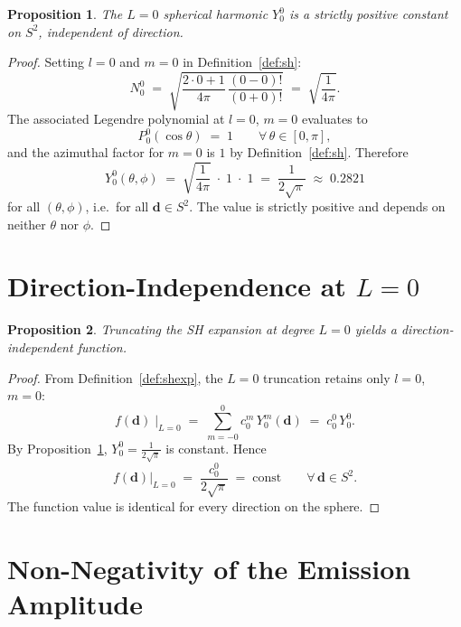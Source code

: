 \documentclass[12pt, a4paper]{article}
\theoremstyle{definition}
\theoremstyle{plain}
\newtheorem{proposition}{Proposition}[section]
\theoremstyle{remark}
\newcommand{\Stwo}{S^2}
\begin{document}
\begin{proposition}
\label{prop:Y00constant}
The $L=0$ spherical harmonic $Y_0^0$ is a strictly positive constant
on $\Stwo$, independent of direction.
\end{proposition}

\begin{proof}
Setting $l=0$ and $m=0$ in Definition~\ref{def:sh}:
\[
  N_0^0
  \;=\;
  \sqrt{\frac{2\cdot 0+1}{4\pi}\,\frac{(0-0)!}{(0+0)!}}
  \;=\;
  \sqrt{\frac{1}{4\pi}}.
\]
The associated Legendre polynomial at $l=0$, $m=0$ evaluates to
\[
  P_0^0(\cos\theta) \;=\; 1 \qquad \forall\,\theta\in[0,\pi],
\]
and the azimuthal factor for $m=0$ is $1$ by Definition~\ref{def:sh}.
Therefore
\[
  \boxed{Y_0^0(\theta,\phi)
  \;=\;
  \sqrt{\frac{1}{4\pi}}\;\cdot\;1\;\cdot\;1
  \;=\;
  \frac{1}{2\sqrt{\pi}}
  \;\approx\;
  0.2821}
\]
for all $(\theta,\phi)$, i.e.\ for all $\mathbf{d}\in\Stwo$.  The
value is strictly positive and depends on neither $\theta$ nor $\phi$.
\end{proof}

\section{Direction-Independence at \texorpdfstring{$L=0$}{L=0}}

\begin{proposition}
\label{prop:dirindep}
Truncating the SH expansion at degree $L=0$ yields a
direction-independent function.
\end{proposition}

\begin{proof}
From Definition~\ref{def:shexp}, the $L=0$ truncation retains only
$l=0$, $m=0$:
\[
  f(\mathbf{d})
  \;\Big|_{L=0}
  \;=\;
  \sum_{m=-0}^{0} c_0^m\,Y_0^m(\mathbf{d})
  \;=\;
  c_0^0\,Y_0^0.
\]
By Proposition~\ref{prop:Y00constant}, $Y_0^0 = \frac{1}{2\sqrt{\pi}}$
is constant.  Hence
\[
  f(\mathbf{d})\Big|_{L=0}
  \;=\;
  \frac{c_0^0}{2\sqrt{\pi}}
  \;=\;
  \mathrm{const}
  \qquad
  \forall\,\mathbf{d}\in\Stwo.
\]
The function value is identical for every direction on the sphere.
\end{proof}

\section{Non-Negativity of the Emission Amplitude}
\end{document}
